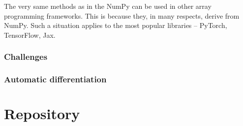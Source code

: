 The very same methods as in the NumPy can be used in other array programming frameworks. This is because they, in many respects, derive from NumPy. Such a situation applies to the most popular libraries -- PyTorch, TensorFlow, Jax.

\subsubsection{Challenges}

\subsubsection{Automatic differentiation}

\section{Repository}